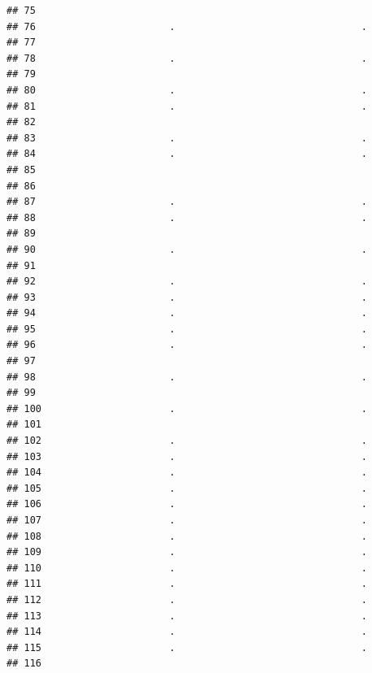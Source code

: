 \documentclass[
]{article}
\begin{document}
\begin{verbatim}
## 75                                                         
## 76                       .                                .
## 77                                                         
## 78                       .                                .
## 79                                                         
## 80                       .                                .
## 81                       .                                .
## 82                                                         
## 83                       .                                .
## 84                       .                                .
## 85                                                         
## 86                                                         
## 87                       .                                .
## 88                       .                                .
## 89                                                         
## 90                       .                                .
## 91                                                         
## 92                       .                                .
## 93                       .                                .
## 94                       .                                .
## 95                       .                                .
## 96                       .                                .
## 97                                                         
## 98                       .                                .
## 99                                                         
## 100                      .                                .
## 101                                                        
## 102                      .                                .
## 103                      .                                .
## 104                      .                                .
## 105                      .                                .
## 106                      .                                .
## 107                      .                                .
## 108                      .                                .
## 109                      .                                .
## 110                      .                                .
## 111                      .                                .
## 112                      .                                .
## 113                      .                                .
## 114                      .                                .
## 115                      .                                .
## 116                                                        

\end{verbatim}
\end{document}
